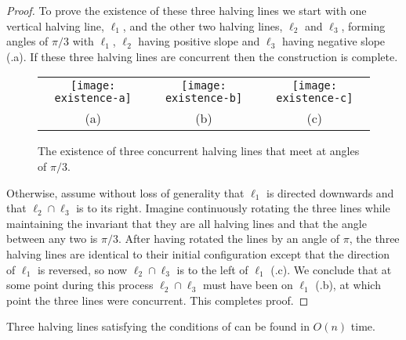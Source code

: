 \documentclass[lotsofwhite]{patmorin}
\begin{document}
\begin{proof}
To prove the existence of these three halving lines we start with one
vertical halving line, $\ell_1$, and the other two halving lines,
$\ell_2$ and $\ell_3$, forming angles of $\pi/3$ with $\ell_1$,
$\ell_2$ having positive slope and $\ell_3$ having negative slope
(.a).  If these three halving lines are concurrent
then the construction is complete. 

\begin{figure}
\begin{center}\begin{tabular}{ccc}
\texttt{[image: existence-a]} &
\texttt{[image: existence-b]} &
\texttt{[image: existence-c]} \\
(a) & (b) & (c)
\end{tabular}\end{center}
\caption{The existence of three concurrent halving lines that meet at angles of
$\pi/3$.}
\end{figure}
Otherwise, assume without loss of generality that $\ell_1$ is directed downwards and that
$\ell_2\cap \ell_3$ is to its right.  Imagine continuously rotating
the three lines while maintaining the invariant that they are all
halving lines and that the angle between any two is $\pi/3$.  After
having rotated the lines by an angle of $\pi$, the three halving lines
are identical to their initial configuration except that the direction
of $\ell_1$ is reversed, so now $\ell_2\cap\ell_3$ is to the left of
$\ell_1$ (.c).  We conclude that at some point
during this process $\ell_2\cap\ell_3$ must have been on $\ell_1$
(.b), at which point the three lines were
concurrent.  This completes proof.  
\end{proof}

\begin{lem}
Three halving lines satisfying the conditions of 
can be found in $O(n)$ time.
\end{lem}
\end{document}
